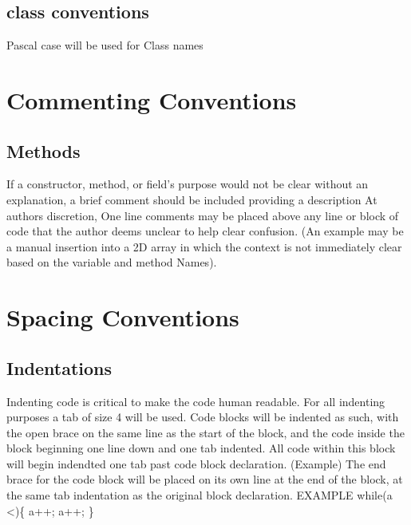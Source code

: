 \documentclass{article}
\begin{document}
\subsection{class conventions}
Pascal case will be used for Class names
\section{Commenting Conventions}
\subsection{Methods}
If a constructor, method, or field’s purpose would not be clear without an explanation, a brief comment should be included providing a description
\newline
At authors discretion, One line comments may be placed above any line or block of code that the author deems unclear to help clear confusion. (An example may be a manual insertion into a 2D array in which the context is not immediately clear based on the variable and method Names).

\section{Spacing Conventions} 

\subsection{Indentations}
Indenting code is critical to make the code human readable. 
\newline 
\newline
For all indenting purposes a tab of size 4 will be used.
\newline 
\newline
Code blocks will be indented as such, with the open brace on the same line as the start of the block, and the code inside the block beginning one line down and one tab indented. All code within this block will begin indendted one tab past code block declaration. (Example) The end brace for the code block will be placed on its own line at the end of the block, at the same tab indentation as the original block declaration. EXAMPLE
\newline 
while(a \textless {})\{ \newline
	\hspace*{1cm}a++;\newline
	\hspace*{1cm}a++; \newline
\}
\end{document}
